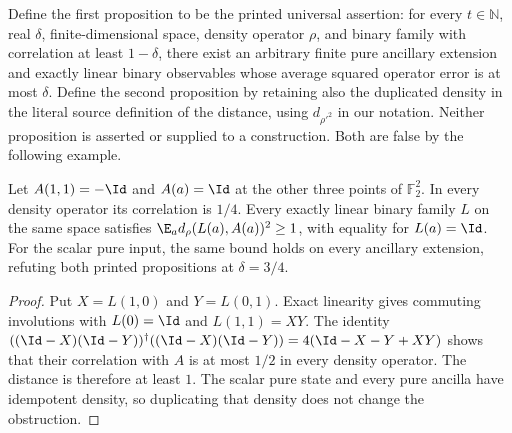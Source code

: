 \begin{definition}
	\label{def:linearity-printed-claim}
	\leanok
	Define the first proposition to be the printed universal assertion: for every
	$t\in\mathbb N$, real $\delta$, finite-dimensional space, density operator
	$\rho$, and binary family with correlation at least $1-\delta$, there
	exist an arbitrary finite pure ancillary extension and exactly linear
	binary observables whose average squared operator error is at most
	$\delta$. Define the second proposition by retaining also the duplicated
	density in the literal source definition of the distance, using
	$d_{\rho'^2}$ in our notation. Neither proposition is asserted or supplied to
	a construction. Both are false by the following example.
\end{definition}

\begin{lemma}
	\label{lem:linearity-four-point-obstruction}
	\leanok
	Let $A(1,1)=-\Id$ and $A(a)=\Id$ at the other three points of
	$\mathbb F_2^2$. In every density operator its correlation is $1/4$.
	Every exactly linear binary family $L$ on the same space satisfies
	$\E_a d_\rho(L(a),A(a))^2\geq1$, with equality for $L(a)=\Id$.
	For the scalar pure input, the same bound holds on every ancillary
	extension, refuting both printed propositions at $\delta=3/4$.
\end{lemma}
\begin{proof}
	\leanok
	Put $X=L(1,0)$ and $Y=L(0,1)$. Exact linearity gives commuting
	involutions with $L(0)=\Id$ and $L(1,1)=XY$. The identity
	$((\Id-X)(\Id-Y))^\dagger((\Id-X)(\Id-Y))=4(\Id-X-Y+XY)$
	shows that their correlation with $A$ is at most $1/2$ in every density
	operator. The distance is therefore at least $1$. The scalar pure state
	and every pure ancilla have idempotent density, so duplicating that
	density does not change the obstruction.
\end{proof}

